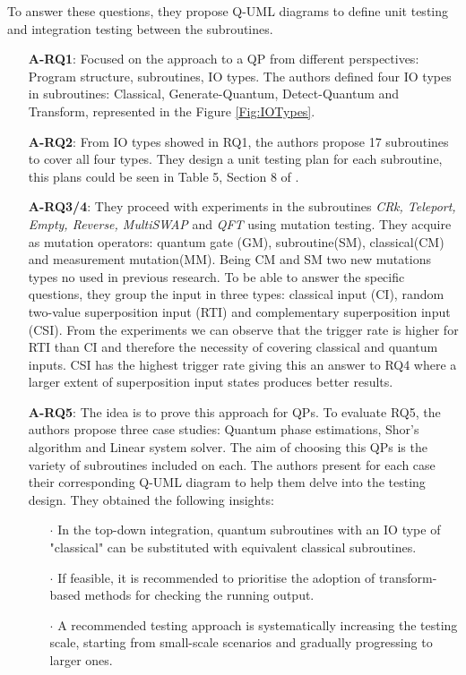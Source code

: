 \begin{itemize}
To answer these questions, they propose Q-UML diagrams to define unit testing and integration testing between the subroutines.
\begin{itemize}
    \item[] \textbf{A-RQ1}: Focused on the approach to a QP from different perspectives: Program structure, subroutines, IO types. The authors defined four IO types in subroutines: Classical, Generate-Quantum, Detect-Quantum and Transform, represented in the Figure \ref{Fig:IOTypes}.
    \item[] \textbf{A-RQ2}: From IO types showed in RQ1, the authors propose 17 subroutines to cover all four types. They design a unit testing plan for each subroutine, this plans could be seen in Table 5, Section 8 of \cite{long2023testing}.
    \item[] \textbf{A-RQ3/4}: They proceed with experiments in the subroutines \textit{CRk, Teleport, Empty, Reverse, MultiSWAP} and \textit{QFT} using mutation testing. They acquire as mutation operators: quantum gate (GM), subroutine(SM), classical(CM) and measurement mutation(MM). Being CM and SM two new mutations types no used in previous research. To be able to answer the specific questions, they group the input in three types: classical input (CI), random two-value superposition input (RTI) and complementary superposition input (CSI).\newline
    From the experiments we can observe that the trigger rate is higher for RTI than CI and therefore the necessity of covering classical and quantum inputs. CSI has the highest trigger rate giving this an answer to RQ4 where a larger extent of superposition input states produces better results.
    \item[] \textbf{A-RQ5}: The idea is to prove this approach for QPs. To evaluate RQ5, the authors propose three case studies: Quantum phase estimations, Shor's algorithm and Linear system solver. The aim of choosing this QPs is the variety of subroutines included on each. The authors present for each case their corresponding Q-UML diagram to help them delve into the testing design. They obtained the following insights:
    \begin{itemize}
        \item[$\cdot$] In the top-down integration, quantum subroutines with an IO type of "classical" can be substituted with equivalent classical subroutines.
        \item[$\cdot$] If feasible, it is recommended to prioritise the adoption of transform-based methods for checking the running output.
        \item[$\cdot$] A recommended testing approach is systematically increasing the testing scale, starting from small-scale scenarios and gradually progressing to larger ones.
    \end{itemize}
\end{itemize}


\end{itemize}
